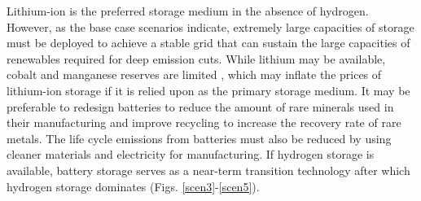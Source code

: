 Lithium-ion is the preferred storage medium in the absence of hydrogen. However, as the base case scenarios indicate, extremely large capacities of storage must be deployed to achieve a stable grid that can sustain the large capacities of renewables required for deep emission cuts. While lithium may be available, cobalt and manganese reserves are limited \cite{scrosati_lithium-ion_2011,simon_potential_2015,turcheniuk_ten_2018} , which may inflate the prices of lithium-ion storage if it is relied upon as the primary storage medium. It may be preferable to redesign batteries to reduce the amount of rare minerals used in their manufacturing and improve recycling to increase the recovery rate of rare metals. The life cycle emissions from batteries must also be reduced by using cleaner materials and electricity for manufacturing. If hydrogen storage is available, battery storage serves as a near-term transition technology after which hydrogen storage dominates (Figs. \ref{scen3}-\ref{scen5}).

